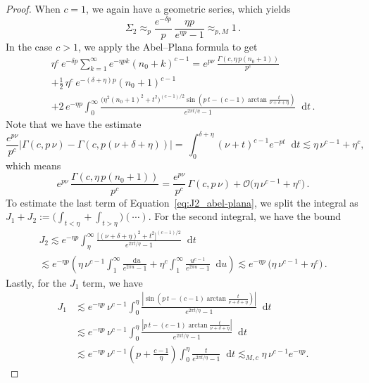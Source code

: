 \documentclass[11pt]{amsart}
\theoremstyle{plain}
\theoremstyle{definition}
\newcommand		{\lt}			{\left}				%
\newcommand		{\rt}			{\right}			%
\renewcommand	{\(}			{\lt(}
\renewcommand	{\)}			{\rt)}
\newcommand		{\n}[1]			{\lt\lvert #1 \rt\rvert}
\renewcommand		{\d}		{\mathop{}\!\mathrm{d}}		%
\begin{document}
\begin{proof}
		When $c=1$, we again have a geometric series, which yields 
		\begin{equation*}
			\Sigma_2\approx_p \frac{e^{-\delta p}}{p} \, \frac{\eta p}{e^{\eta p}-1} \approx_{p, M} 1 \, .
		\end{equation*}
		In the case $c>1$, we apply the Abel--Plana formula to get 
		\begin{multline}\label{eq:J2_abel-plana}
			\eta^c \, e^{- \delta p}\sum_{k=1}^\infty e^{-\eta p k} \lt(n_0+k\rt)^{c-1} =  e^{p\nu} \, \frac{\Gamma(c, \eta\, p\lt(n_0+1\rt))}{p^c}
			\\
			+\tfrac{1}{2}\, \eta^c\, e^{-(\delta+\eta)p} \lt(n_0+1\rt)^{c-1}
			\\
			+2 \, e^{-\eta p} \int_0^\infty 
			\frac{\bigl(\eta^2\lt(n_0+1\rt)^2 + t^2\bigr)^{(c-1)/2} 
			\sin\!\lt(p \, t- \lt(c-1\rt) \arctan\frac{t}{\nu+\delta+\eta}  \rt)}
			{e^{2\pi t/\eta} - 1} \d t \, .
		\end{multline}
		Note that we have the estimate 
		\begin{equation*}
			\frac{e^{p\nu}}{p^c}\n{\Gamma(c, p\,\nu)-\Gamma(c, p\lt(\nu+\delta+\eta\rt))} =\, \int^{\delta+\eta}_0 (\nu + t)^{c-1} e^{-p t}\d t
			\lesssim  \eta\, \nu^{c-1}+\eta^c,
		\end{equation*}
		which means 
		\begin{equation*}
			e^{p\nu}\,\frac{\Gamma(c, \eta\, p\lt(n_0+1\rt))}{p^c} = \frac{e^{p\nu}}{p^c} \,\Gamma(c, p\,\nu) + \mathcal{O}\bigl(\eta\,\nu^{c-1}+\eta^c\bigr)\,.
		\end{equation*}
		To estimate the last term of Equation~\eqref{eq:J2_abel-plana}, we split the integral as $J_1+J_2 := \bigl(\int_{t<\eta} + \int_{t>\eta}\bigr)(\cdots)$. For the second integral, we have the bound 
		\begin{multline*}
			J_2 \lesssim e^{-\eta p}\int^\infty_\eta \frac{\big[(\nu+\delta+\eta)^2 + t^2\big]^{(c-1)/2}}
			{e^{2\pi t/\eta} - 1} \d t
			\\
			\lesssim e^{-\eta p}\lt( \eta\,\nu^{c-1} \int^\infty_1 \frac{\d u}
			{e^{2\pi u} - 1} + \eta^c\int^\infty_1 \frac{u^{c-1}}{e^{2\pi u}-1}\d u \rt) \lesssim e^{-\eta p}\, \bigl(\eta\,\nu^{c-1}+\eta^c\bigr) \, .
		\end{multline*}
		Lastly, for the $J_1$ term, we have 
		\begin{align*}
			J_1 &\lesssim e^{-\eta p} \, \nu^{c-1}\int^\eta_0 \frac{\n{ 
			\sin\!\lt(p\, t- \lt(c-1\rt)\arctan\frac{t}{\nu+\delta+\eta}  \rt)}}
			{e^{2\pi t/\eta} - 1} \d t
			\\
			&\lesssim e^{-\eta p}\, \nu^{c-1}\int^\eta_0 \frac{\n{ p\, t - \lt(c-1\rt)\arctan\frac{t}{\nu+\delta+\eta}}}{e^{2\pi t/\eta} - 1} \d t
			\\
			&\lesssim e^{-\eta p}\,\nu^{c-1}\lt(p+\frac{c-1}{\eta}\rt)\int^\eta_0\frac{t}{e^{2\pi t/\eta}-1}\d t\lesssim_{M, c}\eta\,\nu^{c-1}e^{-\eta p}.
		\end{align*}
	

\end{proof}
\end{document}
